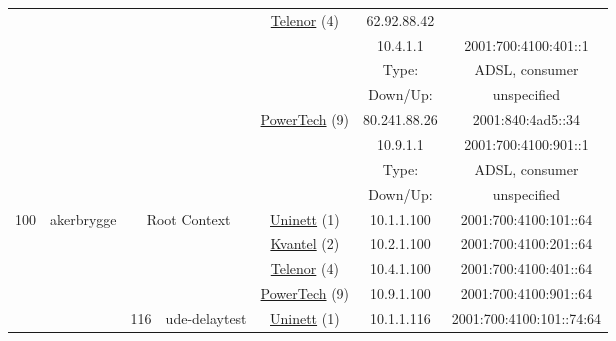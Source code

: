 \begin{small}
\begin{center}
\begin{longtable}{|c|c|c|c|c|c|c|c|}
  & \multicolumn{3}{|c|}{} & \multicolumn{2}{|c|}{\multirow{4}{*}{\tiny{\href{https://www.telenor.no}{Telenor} (4)}}} & \tiny{62.92.88.42} & \frownie{} \\* \cline{7-7}\cline{8-8}
  & \multicolumn{3}{|c|}{} & \multicolumn{2}{|c|}{} & \tiny{10.4.1.1} & \tiny{2001:700:4100:401::1} \\* \cline{7-7}\cline{8-8}
  & \multicolumn{3}{|c|}{} & \multicolumn{2}{|c|}{} & Type: & ADSL, consumer \\* \cline{7-7}\cline{8-8}
  & \multicolumn{3}{|c|}{} & \multicolumn{2}{|c|}{} & Down/Up:  & unspecified \\* \cline{5-5}\cline{6-6}\cline{7-7}\cline{8-8}
  & \multicolumn{3}{|c|}{} & \multicolumn{2}{|c|}{\multirow{4}{*}{\tiny{\href{http://www.powertech.no}{PowerTech} (9)}}} & \tiny{80.241.88.26} & \tiny{2001:840:4ad5::34} \\* \cline{7-7}\cline{8-8}
  & \multicolumn{3}{|c|}{} & \multicolumn{2}{|c|}{} & \tiny{10.9.1.1} & \tiny{2001:700:4100:901::1} \\* \cline{7-7}\cline{8-8}
  & \multicolumn{3}{|c|}{} & \multicolumn{2}{|c|}{} & Type: & ADSL, consumer \\* \cline{7-7}\cline{8-8}
  & \multicolumn{3}{|c|}{} & \multicolumn{2}{|c|}{} & Down/Up:  & unspecified \\ \hline
 \multirow{32}{*}{\tiny{100}} & \multicolumn{1}{|l|}{\multirow{32}{*}{\tiny{akerbrygge}}} & \multicolumn{2}{|c|}{\multirow{4}{*}{\tiny{Root Context}}} & \multicolumn{2}{|c|}{\tiny{\href{https://www.uninett.no}{Uninett} (1)}} & \tiny{10.1.1.100} & \tiny{2001:700:4100:101::64} \\* \cline{5-5}\cline{6-6}\cline{7-7}\cline{8-8}
  &  & \multicolumn{2}{|c|}{} & \multicolumn{2}{|c|}{\tiny{\href{http://kvantel.no}{Kvantel} (2)}} & \tiny{10.2.1.100} & \tiny{2001:700:4100:201::64} \\* \cline{5-5}\cline{6-6}\cline{7-7}\cline{8-8}
  &  & \multicolumn{2}{|c|}{} & \multicolumn{2}{|c|}{\tiny{\href{https://www.telenor.no}{Telenor} (4)}} & \tiny{10.4.1.100} & \tiny{2001:700:4100:401::64} \\* \cline{5-5}\cline{6-6}\cline{7-7}\cline{8-8}
  &  & \multicolumn{2}{|c|}{} & \multicolumn{2}{|c|}{\tiny{\href{http://www.powertech.no}{PowerTech} (9)}} & \tiny{10.9.1.100} & \tiny{2001:700:4100:901::64} \\* \cline{3-3}\cline{4-4}\cline{5-5}\cline{6-6}\cline{7-7}\cline{8-8}
  &  & \multirow{4}{*}{\tiny{116}} & \multicolumn{1}{|l|}{\multirow{4}{*}{\tiny{ude-delaytest}}} & \multicolumn{2}{|c|}{\tiny{\href{https://www.uninett.no}{Uninett} (1)}} & \tiny{10.1.1.116} & \tiny{2001:700:4100:101::74:64} \\* \cline{5-5}\cline{6-6}\cline{7-7}\cline{8-8}

\end{longtable}
\end{center}
\end{small}
